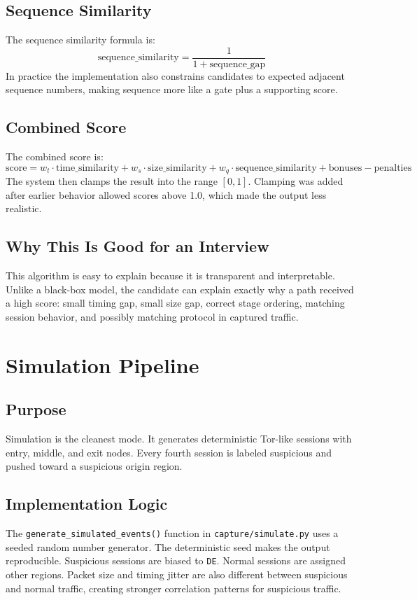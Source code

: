\documentclass[12pt,a4paper]{report}
\begin{document}
\section{Sequence Similarity}
The sequence similarity formula is:
\[
\text{sequence\_similarity} = \frac{1}{1 + \text{sequence\_gap}}
\]
In practice the implementation also constrains candidates to expected adjacent sequence numbers, making sequence more like a gate plus a supporting score.

\section{Combined Score}
The combined score is:
\[
\text{score} = w_t \cdot \text{time\_similarity}
+ w_s \cdot \text{size\_similarity}
+ w_q \cdot \text{sequence\_similarity}
+ \text{bonuses} - \text{penalties}
\]
The system then clamps the result into the range $[0,1]$. Clamping was added after earlier behavior allowed scores above 1.0, which made the output less realistic.

\section{Why This Is Good for an Interview}
This algorithm is easy to explain because it is transparent and interpretable. Unlike a black-box model, the candidate can explain exactly why a path received a high score: small timing gap, small size gap, correct stage ordering, matching session behavior, and possibly matching protocol in captured traffic.

\chapter{Simulation Pipeline}
\section{Purpose}
Simulation is the cleanest mode. It generates deterministic Tor-like sessions with entry, middle, and exit nodes. Every fourth session is labeled suspicious and pushed toward a suspicious origin region.

\section{Implementation Logic}
The \texttt{generate\_simulated\_events()} function in \texttt{capture/simulate.py} uses a seeded random number generator. The deterministic seed makes the output reproducible. Suspicious sessions are biased to \texttt{DE}. Normal sessions are assigned other regions. Packet size and timing jitter are also different between suspicious and normal traffic, creating stronger correlation patterns for suspicious traffic.
\end{document}
